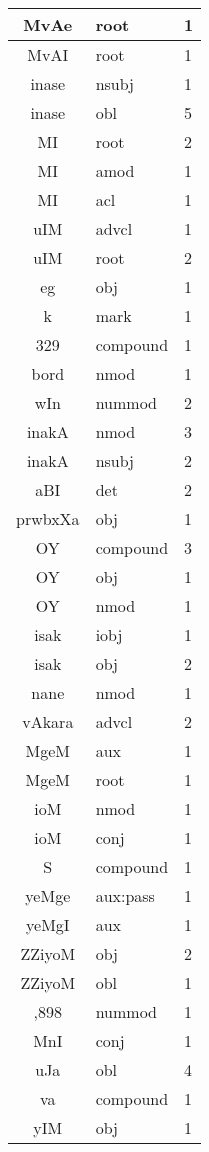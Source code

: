 \documentclass[a4 paper]{article}
\begin{document}
\begin{longtable}{cp{}p{}}
MvAe & root & 1\\ \midrule 
MvAI & root & 1\\ \midrule 
inase & nsubj & 1\\ \midrule inase & obl & 5\\ \midrule 
MI & root & 2\\ \midrule MI & amod & 1\\ \midrule MI & acl & 1\\ \midrule 
uIM & advcl & 1\\ \midrule uIM & root & 2\\ \midrule 
eg & obj & 1\\ \midrule 
k & mark & 1\\ \midrule 
329 & compound & 1\\ \midrule 
bord & nmod & 1\\ \midrule 
wIn & nummod & 2\\ \midrule 
inakA & nmod & 3\\ \midrule inakA & nsubj & 2\\ \midrule 
aBI & det & 2\\ \midrule 
prwbxXa & obj & 1\\ \midrule 
OY & compound & 3\\ \midrule OY & obj & 1\\ \midrule OY & nmod & 1\\ \midrule 
isak & iobj & 1\\ \midrule isak & obj & 2\\ \midrule 
nane & nmod & 1\\ \midrule 
vAkara & advcl & 2\\ \midrule 
MgeM & aux & 1\\ \midrule MgeM & root & 1\\ \midrule 
ioM & nmod & 1\\ \midrule ioM & conj & 1\\ \midrule 
S & compound & 1\\ \midrule 
yeMge & aux:pass & 1\\ \midrule 
yeMgI & aux & 1\\ \midrule 
ZZiyoM & obj & 2\\ \midrule ZZiyoM & obl & 1\\ \midrule 
,898 & nummod & 1\\ \midrule 
MnI & conj & 1\\ \midrule 
uJa & obl & 4\\ \midrule 
va & compound & 1\\ \midrule 
yIM & obj & 1\\ \midrule 

\end{longtable}
\end{document}
